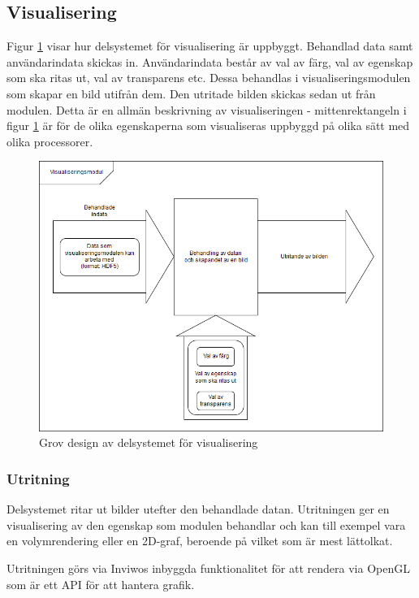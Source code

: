 \documentclass[a4paper,12pt,twoside,openright]{report}
\begin{document}
\subsection{Visualisering}
\label{ch:visualisering}
Figur \ref{fig:visualisering} visar hur delsystemet för visualisering är uppbyggt. Behandlad data samt användarindata skickas in. Användarindata består av val av färg, val av egenskap som ska ritas ut, val av transparens etc. Dessa behandlas i visualiseringsmodulen som skapar en bild utifrån dem. Den utritade bilden skickas sedan ut från modulen. Detta är en allmän beskrivning av visualiseringen - mittenrektangeln i figur \ref{fig:visualisering} är för de olika egenskaperna som visualiseras uppbyggd på olika sätt med olika processorer.
\label{visualisering}
\begin{figure}[H]
	\centering
	\includegraphics[scale=0.45]{Visualisering.png}
	\caption{Grov design av delsystemet för visualisering}
	\label{fig:visualisering}
\end{figure}
\subsubsection{Utritning}
Delsystemet ritar ut bilder utefter den behandlade datan. Utritningen ger en visualisering av den egenskap som modulen behandlar och kan till exempel vara en volymrendering eller en 2D-graf, beroende på vilket som är mest lättolkat. 

Utritningen görs via Inviwos inbyggda funktionalitet för att rendera via OpenGL som är ett API för att hantera grafik. 
\end{document}
